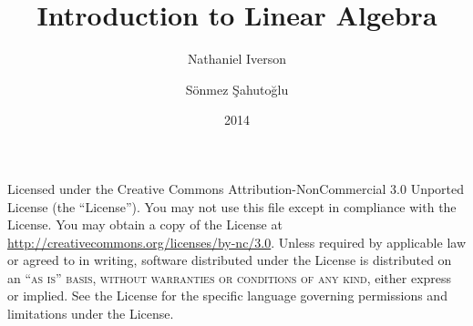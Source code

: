 \documentclass[12pt,fleqn]{fancybook} %
\author{Nathaniel Iverson
\and
S\"{o}nmez \c{S}ahuto\u{g}lu}
\title{Introduction to Linear Algebra}
\date{2014}
\begin{document}
\frontmatter

\maketitle

\begin{copyrightpage}
\noindent Licensed under the Creative Commons Attribution-NonCommercial 3.0 Unported License (the ``License''). You may not use this file except in compliance with the License. You may obtain a copy of the License at \url{http://creativecommons.org/licenses/by-nc/3.0}. Unless required by applicable law or agreed to in writing, software distributed under the License is distributed on an \textsc{``as is'' basis, without warranties or conditions of any kind}, either express or implied. See the License for the specific language governing permissions and limitations under the License.\\ %
\end{copyrightpage}

%

\mainmatter


\appendix


%

\backmatter

\nocite{*}


\end{document}
